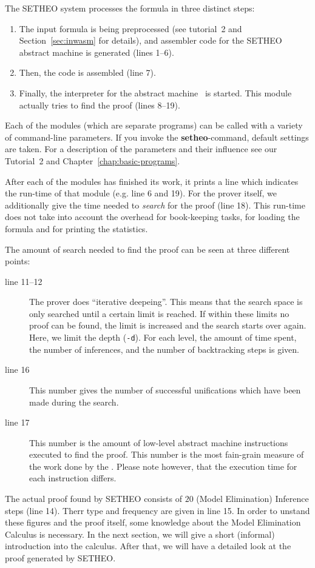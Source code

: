 The SETHEO system processes the formula in three distinct steps:
\begin{enumerate}
\item
The input formula is being preprocessed (see tutorial~2 and
Section~\ref{sec:inwasm} for details), and assembler code for the
SETHEO abstract machine is generated (lines 1--6).
\item
Then, the code is assembled (line 7).
\item
Finally, the interpreter for the abstract machine \SAM\  is started.
This module actually tries to find the proof (lines 8--19).
\end{enumerate}

Each of the modules (which are separate programs) can be called with
a variety of command-line parameters. If you invoke the {\bf setheo}-command,
default settings are taken. For a description of the parameters and their
influence see our Tutorial~2 and Chapter~\ref{chap:basic-programs}.

After each of the modules has finished its work, it prints a line
which indicates the run-time of that module (e.g. line 6 and 19).
For the prover itself, we additionally give the time needed to
{\em search\/} for the proof (line 18). This run-time does not
take into account the overhead for book-keeping tasks, for loading the
formula and for printing the statistics.

The amount of search needed to find the proof can be seen at three
different points:
\begin{description}
\item[line 11--12]
	The prover does ``iterative deepeing''. This means that
	the search space is only searched until a certain limit
	is reached. If within these limits no proof can be found, the
	limit is increased and the search starts over again. Here,
	we limit the depth ({\tt -d}). For each level, the amount of
	time spent, the number of inferences, and the number of
	backtracking steps is given.
\item[line 16]
	This number gives the number of successful unifications which
	have been made during the search.
\item[line 17]
	This number is the amount of low-level abstract machine instructions
	executed to find the proof. This number is the most fain-grain
	measure of the work done by the \SAM. Please note however, that
	the execution time for each instruction differs.
\end{description}


The actual proof found by SETHEO consists of $20$ (Model Elimination)
Inference steps (line 14). Therr type and frequency
are given in line 15.
In order to unstand these figures and the proof itself, some
knowledge about the Model Elimination Calculus is necessary.
In the next section, we will give a short (informal) introduction into
the calculus. After that, we will have a detailed look at the proof
generated by SETHEO.


